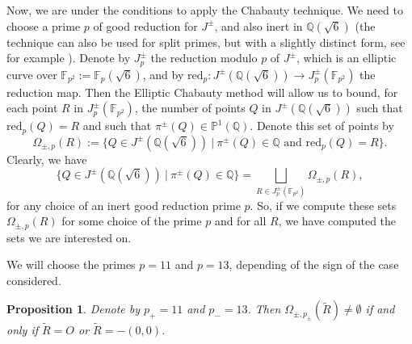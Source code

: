 \documentclass[a4paper,12pt]{amsart}
\newtheorem{prop}[thm]{Proposition}
\theoremstyle{remark}
\theoremstyle{definition}
\begin{document}
Now, we are under the conditions to apply the Chabauty technique.
We need to choose a prime $p$ of good reduction for $J^{\pm}$, and
also inert in ${{\mathbb{Q}}}(\sqrt{6})$ (the technique can also be used for
split primes, but with a slightly distinct form, see for example
\cite{Br}). Denote by $J^{\pm}_p$ the reduction modulo $p$ of $J^{\pm}$,
which is an elliptic curve over ${{\mathbb{F}}}_{p^2}:={{\mathbb{F}}}_p(\sqrt{6})$, and
by $\mbox{red}_p:J^{\pm}({{\mathbb{Q}}}(\sqrt{6})) \to J^{\pm}_p({{\mathbb{F}}}_{p^2})$ the
reduction map. Then the Elliptic Chabauty method will allow us to
bound, for each point $R$ in $J^{\pm}_p({{\mathbb{F}}}_{p^2})$, the number of
points $Q$ in $J^{\pm}({{\mathbb{Q}}}(\sqrt{6}))$ such that $\mbox{red}_p(Q)=R$
and such that $\pi^{\pm}(Q)\in{{\mathbb{P}}}^1({{\mathbb{Q}}})$. Denote this set of points
by
$$\Omega_{\pm,p}(R):=\{Q\in J^{\pm}({{\mathbb{Q}}}(\sqrt{6}))\ | \
\pi^{\pm}(Q)\in {{\mathbb{Q}}} \mbox{ and } \mbox{red}_p(Q)=R\}.$$ Clearly,
we have
$$\{Q\in J^{\pm}({{\mathbb{Q}}}(\sqrt{6}))\ | \
\pi^{\pm}(Q)\in {{\mathbb{Q}}}\} = \bigsqcup_{R\in J^{\pm}_p({{\mathbb{F}}}_{p^2})}
\Omega_{\pm,p}(R),$$ for any choice of an inert good reduction
prime $p$. So, if we compute these sets $\Omega_{\pm,p}(R)$ for
some choice of the prime $p$ and for all $R$, we have computed the
sets we are interested on.

We will choose the primes $p=11$ and $p=13$, depending of the sign
of the case considered.

\begin{prop}\label{badpoints} Denote by $p_{+}=11$ and $p_{-}=13$. Then
$\Omega_{\pm,p_{\pm}}(\widetilde{R})\ne \emptyset$ if and only if
$\widetilde{R}=O$ or $\widetilde{R}=-(0,0)$.
\end{prop}
\end{document}
